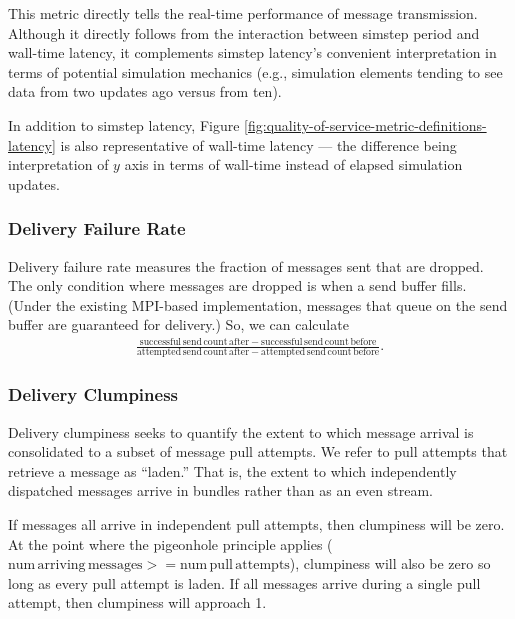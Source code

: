 This metric directly tells the real-time performance of message transmission.
Although it directly follows from the interaction between simstep period and wall-time latency, it complements simstep latency's convenient interpretation in terms of potential simulation mechanics (e.g., simulation elements tending to see data from two updates ago versus from ten).

In addition to simstep latency, Figure \ref{fig:quality-of-service-metric-definitions-latency} is also representative of wall-time latency --- the difference being interpretation of $y$ axis in terms of wall-time instead of elapsed simulation updates.

\subsubsection{Delivery Failure Rate} \label{sec:delivery-failure-rate-metric}

Delivery failure rate measures the fraction of messages sent that are dropped.
The only condition where messages are dropped is when a send buffer fills.
(Under the existing MPI-based implementation, messages that queue on the send buffer are guaranteed for delivery.)
So, we can calculate
\begin{align*}
  \frac{
    \mathrm{successful\,send\,count\,after} - \mathrm{successful\,send\,count\,before}
  }{
    \mathrm{attempted\,send\,count\,after} - \mathrm{attempted\,send\,count\,before}
  }.
\end{align*}

\subsubsection{Delivery Clumpiness} \label{sec:delivery-clumpiness-metric}

Delivery clumpiness seeks to quantify the extent to which message arrival is consolidated to a subset of message pull attempts.
We refer to pull attempts that retrieve a message as ``laden.''
That is, the extent to which independently dispatched messages arrive in bundles rather than as an even stream.

If messages all arrive in independent pull attempts, then clumpiness will be zero.
At the point where the pigeonhole principle applies ($\mathrm{num\,arriving\,messages} >= \mathrm{num\,pull\,attempts}$), clumpiness will also be zero so long as every pull attempt is laden.
If all messages arrive during a single pull attempt, then clumpiness will approach 1.

